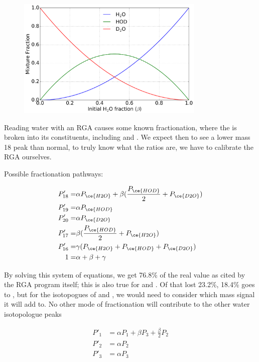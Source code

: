 \begin{figure}[H]
	\label{fig: mixture}
	\centering
	\includegraphics[width=0.8\textwidth]{images/Be_HOD_isotopologues.png}
	\caption{}
\end{figure}

Reading water with an RGA causes some known fractionation, where the  is broken into its constituents, including  and . We expect then to see a lower mass 18 peak than normal, to truly know what the ratios are, we have to calibrate the RGA ourselves.

Possible fractionation pathways:

\begin{align}
	P'_{18} = & \alpha P_{\ce{H2O}} + \beta (\frac{P_{\ce{HOD}}}{2}+P_{\ce{D2O}}) \\
	P'_{19} = & \alpha P_{\ce{HOD}} \\
	P'_{20} = & \alpha P_{\ce{D2O}} \\
	P'_{17} = & \beta (\frac{P_{\ce{HOD}}}{2} + P_{\ce{H2O}}) \\
	P'_{16} = & \gamma (P_{\ce{H2O}} + P_{\ce{HOD}} + P_{\ce{D2O}}) \\
	1 = & \alpha + \beta + \gamma
\end{align}

By solving this system of equations, we get 76.8\% of the real value as cited by the RGA program itself; this is also true for  and . Of that lost 23.2\%, 18.4\% goes to , but for the isotopogues of  and , we would need to consider which mass signal it will add to. No other mode of fractionation will contribute to the other water isotopologue peaks

\begin{align}
	P'_1 & = \alpha P_1 + \beta P_3 + \frac{\beta}{2} P_2 \\
	P'_2 & = \alpha P_2 \\
	P'_3 & = \alpha P_3
\end{align}

